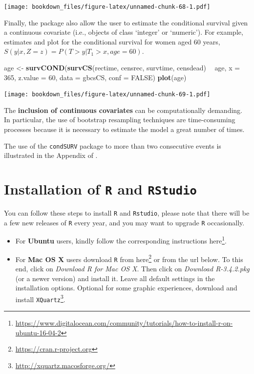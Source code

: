 \documentclass[]{book}
\makeatletter
\newenvironment{Shaded}{\begin{snugshade}}{\end{snugshade}}
\newcommand{\KeywordTok}[1]{\textcolor[rgb]{0.13,0.29,0.53}{\textbf{#1}}}
\newcommand{\DataTypeTok}[1]{\textcolor[rgb]{0.13,0.29,0.53}{#1}}
\newcommand{\DecValTok}[1]{\textcolor[rgb]{0.00,0.00,0.81}{#1}}
\newcommand{\StringTok}[1]{\textcolor[rgb]{0.31,0.60,0.02}{#1}}
\newcommand{\OtherTok}[1]{\textcolor[rgb]{0.56,0.35,0.01}{#1}}
\newcommand{\OperatorTok}[1]{\textcolor[rgb]{0.81,0.36,0.00}{\textbf{#1}}}
\newcommand{\NormalTok}[1]{#1}
\let\rmarkdownfootnote\footnote%
\def\footnote{\protect\rmarkdownfootnote}
\renewcommand{\href}[2]{#2\footnote{\url{#1}}}
\newenvironment{kframe}{%
\medskip{}
\setlength{\fboxsep}{.8em}
 \def\at@end@of@kframe{}%
 \ifinner\ifhmode%
  \def\at@end@of@kframe{\end{minipage}}%
  \begin{minipage}{\columnwidth}%
 \fi\fi%
 \def\FrameCommand##1{\hskip\@totalleftmargin \hskip-\fboxsep
 \colorbox{shadecolor}{##1}\hskip-\fboxsep
     \hskip-\linewidth \hskip-\@totalleftmargin \hskip\columnwidth}%
 \MakeFramed {\advance\hsize-\width
   \@totalleftmargin\z@ \linewidth\hsize
   \@setminipage}}%
 {\par\unskip\endMakeFramed%
 \at@end@of@kframe}
\renewenvironment{Shaded}{\begin{kframe}}{\end{kframe}}
\theoremstyle{definition}
\theoremstyle{definition}
\theoremstyle{definition}
\theoremstyle{remark}
\let\BeginKnitrBlock\begin \let\EndKnitrBlock\end
\makeatother
\begin{document}
\texttt{[image: bookdown\_files/figure-latex/unnamed-chunk-68-1.pdf]}

Finally, the package also allow the user to estimate the conditional
survival given a continuous covariate (i.e., objects of class `integer'
or `numeric'). For example, estimates and plot for the conditional
survival for women aged 60 years, \(S(y|x,Z=z)=P(T>y|T_1>x, age=60)\).

\begin{Shaded}
\begin{Highlighting}[]
\NormalTok{age <-}\StringTok{ }\KeywordTok{survCOND}\NormalTok{(}\KeywordTok{survCS}\NormalTok{(rectime, censrec, survtime, censdead) }\OperatorTok{~}\StringTok{ }\NormalTok{age, }\DataTypeTok{x =} \DecValTok{365}\NormalTok{, }
                \DataTypeTok{z.value =} \DecValTok{60}\NormalTok{, }\DataTypeTok{data =}\NormalTok{ gbcsCS, }\DataTypeTok{conf =} \OtherTok{FALSE}\NormalTok{)}
\KeywordTok{plot}\NormalTok{(age)}
\end{Highlighting}
\end{Shaded}

\texttt{[image: bookdown\_files/figure-latex/unnamed-chunk-69-1.pdf]}

\BeginKnitrBlock{rmdhint_sestelo}
The \textbf{inclusion of continuous covariates} can be computationally
demanding. In particular, the use of bootstrap resampling techniques are
time-consuming processes because it is necessary to estimate the model a
great number of times.
\EndKnitrBlock{rmdhint_sestelo}

The use of the \texttt{condSURV} package to more than two consecutive
events is illustrated in the Appendix of
\citet{meiramachado-sestelo:2016}.

\appendix


\chapter{\texorpdfstring{Installation of \texttt{R} and
\texttt{RStudio}}{Installation of R and RStudio}}\label{appendix-install}

You can follow these steps to install \texttt{R} and \texttt{Rstudio},
please note that there will be a few new releases of \texttt{R} every
year, and you may want to upgrade \texttt{R} occasionally.

\begin{itemize}
\item
  For \textbf{Ubuntu} users, kindly follow the corresponding
  instructions
  \href{https://www.digitalocean.com/community/tutorials/how-to-install-r-on-ubuntu-16-04-2}{here}.
\item
  For \textbf{Mac OS X} users download \texttt{R} from
  \href{https://cran.r-project.org}{here} or from the url below. To this
  end, click on \emph{Download R for Mac OS X}. Then click on
  \emph{Download R-3.4.2.pkg} (or a newer version) and install it. Leave
  all default settings in the installation options. Optional for some
  graphic experiences, download and install
  \href{http://xquartz.macosforge.org/}{\texttt{XQuartz}}.
\end{itemize}
\end{document}
